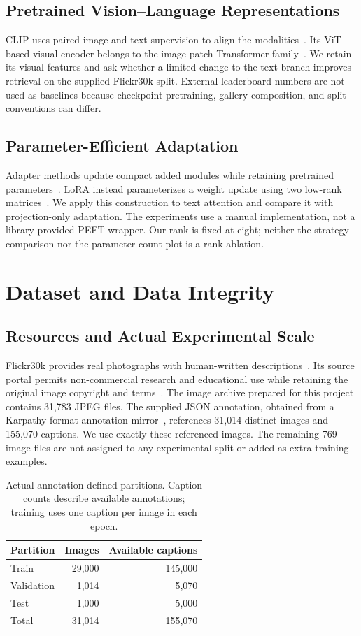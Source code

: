 \documentclass[conference]{IEEEtran}
\begin{document}
\subsection{Pretrained Vision--Language Representations}
CLIP uses paired image and text supervision to align the modalities~\cite{radford2021clip}. Its ViT-based visual encoder belongs to the image-patch Transformer family~\cite{dosovitskiy2021vit}. We retain its visual features and ask whether a limited change to the text branch improves retrieval on the supplied Flickr30k split. External leaderboard numbers are not used as baselines because checkpoint pretraining, gallery composition, and split conventions can differ.

\subsection{Parameter-Efficient Adaptation}
Adapter methods update compact added modules while retaining pretrained parameters~\cite{houlsby2019adapters}. LoRA instead parameterizes a weight update using two low-rank matrices~\cite{hu2022lora}. We apply this construction to text attention and compare it with projection-only adaptation. The experiments use a manual implementation, not a library-provided PEFT wrapper. Our rank is fixed at eight; neither the strategy comparison nor the parameter-count plot is a rank ablation.

\section{Dataset and Data Integrity}
\subsection{Resources and Actual Experimental Scale}
Flickr30k provides real photographs with human-written descriptions~\cite{young2014flickr}. Its source portal permits non-commercial research and educational use while retaining the original image copyright and terms~\cite{flickrportal}. The image archive prepared for this project contains 31,783 JPEG files. The supplied JSON annotation, obtained from a Karpathy-format annotation mirror~\cite{karpathymirror}, references 31,014 distinct images and 155,070 captions. We use exactly these referenced images. The remaining 769 image files are not assigned to any experimental split or added as extra training examples.

\begin{table}[t]
\caption{Actual annotation-defined partitions. Caption counts describe available annotations; training uses one caption per image in each epoch.}
\label{tab:data}
\centering
\begin{tabular}{lrr}
\toprule
Partition & Images & Available captions\\
\midrule
Train & 29,000 & 145,000\\
Validation & 1,014 & 5,070\\
Test & 1,000 & 5,000\\
\midrule
Total & 31,014 & 155,070\\
\bottomrule
\end{tabular}
\end{table}
\end{document}
